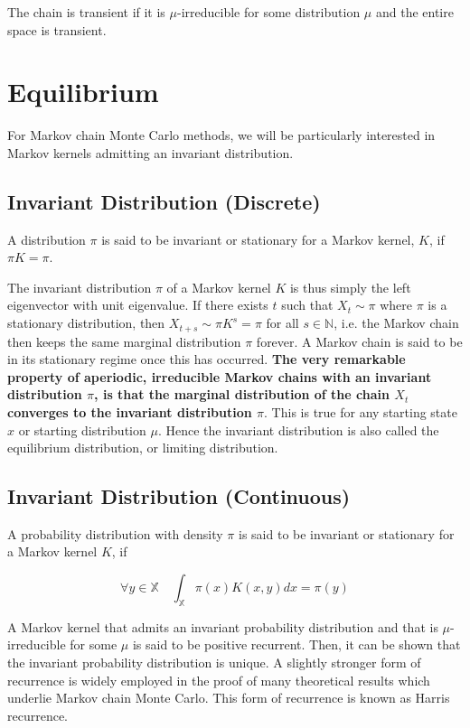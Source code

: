 \documentclass[10pt]{article}
\begin{document}
The chain is transient if it is $\mu$-irreducible for some distribution $\mu$ and the entire space is transient.

\section{Equilibrium}
For Markov chain Monte Carlo methods, we will be particularly interested in Markov kernels admitting an invariant distribution.
\subsection{Invariant Distribution (Discrete)}
A distribution $\pi$ is said to be invariant or stationary for a Markov kernel, $K$, if $\pi K=\pi$.

The invariant distribution $\pi$ of a Markov kernel $K$ is thus simply the left eigenvector with unit eigenvalue. If there exists $t$ such that $X_{t} \sim \pi$ where $\pi$ is a stationary distribution, then $X_{t+s} \sim \pi K^{s}=\pi$ for all $s \in \mathbb{N}$, i.e. the Markov chain then keeps the same marginal distribution $\pi$ forever. A Markov chain is said to be in its stationary regime once this has occurred.
\textbf{The very remarkable property of \textbf{aperiodic}, \textbf{irreducible} Markov chains with an invariant distribution $\pi$, is that the marginal distribution of the chain $X_{t}$ converges to the invariant distribution $\pi$}. This is true for any starting state $x$ or starting distribution $\mu$. Hence the invariant distribution is also called the equilibrium distribution, or limiting distribution.

\subsection{Invariant Distribution (Continuous)}
 A probability distribution with density $\pi$ is said to be invariant or stationary for a Markov kernel $K$, if

$$
\forall y \in \mathbb{X} \quad \int_{\mathbb{X}} \pi(x) K(x, y) d x=\pi(y)
$$

A Markov kernel that admits an invariant probability distribution and that is $\mu$-irreducible for some $\mu$ is said to be positive recurrent. Then, it can be shown that the invariant probability distribution is unique. A slightly stronger form of recurrence is widely employed in the proof of many theoretical results which underlie Markov chain Monte Carlo. This form of recurrence is known as Harris recurrence.
\end{document}

